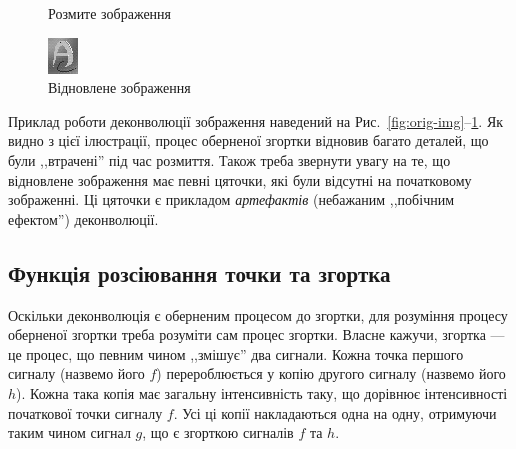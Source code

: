 \documentclass[simple,14pt,utf8,ukrainian]{eskdtext}
\begin{document}
\begin{figure}[!htb]
        \caption{Розмите зображення}\label{fig:conv-img}
      \endminipage\hfill
        \includegraphics[width=\linewidth]{ADecon.jpg}
        \caption{Відновлене зображення}\label{fig:deconv-img}
      \endminipage\hfill
  \end{figure}

  Приклад роботи деконволюції зображення наведений на
  Рис.~\ref{fig:orig-img}--\ref{fig:deconv-img}.
  Як видно з цієї ілюстрації, процес оберненої згортки відновив багато
  деталей, що були ,,втрачені'' під час розмиття.
  Також треба звернути увагу на те, що відновлене зображення має певні
  цяточки, які були відсутні на початковому зображенні.
  Ці цяточки є прикладом \emph{артефактів} (небажаним ,,побічним ефектом'')
  деконволюції.\cite{deconvolve-index}
  \clearpage

  \subsection{Функція розсіювання точки та згортка}
    Оскільки деконволюція є оберненим процесом до згортки, для розуміння
    процесу оберненої згортки треба розуміти сам процес згортки.
    Власне кажучи, згортка --- це процес, що певним чином ,,змішує'' два
    сигнали.
    Кожна точка першого сигналу (назвемо його $f$) перероблюється у копію
    другого сигналу (назвемо його $h$).
    Кожна така копія має загальну інтенсивність таку, що дорівнює
    інтенсивності початкової точки сигналу $f$.
    Усі ці копії накладаються одна на одну, отримуючи таким чином сигнал $g$,
    що є згорткою сигналів $f$ та $h$.
\end{document}
